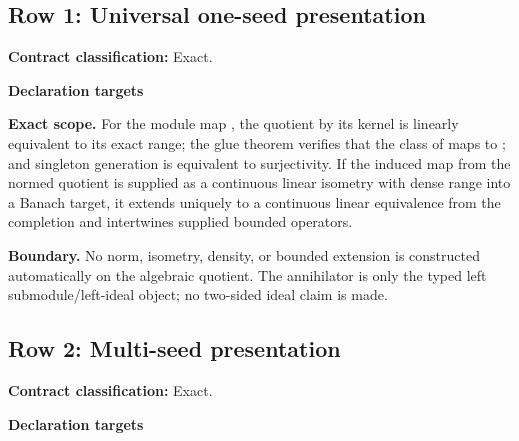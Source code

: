 \subsection{Row 1: Universal one-seed presentation}
\label{row:1}
\textbf{Contract classification:} Exact.
\par\smallskip\textbf{Declaration targets}\par
{\small\noindent{}\par}
{\small\noindent{}\par}
{\small\noindent{}\par}
{\small\noindent{}\par}
{\small\noindent{}\par}
{\small\noindent{}\par}
\medskip\noindent\textbf{Exact scope.} For the module map , the quotient by its kernel is linearly equivalent to its exact range; the glue theorem verifies that the class of  maps to ; and singleton generation is equivalent to surjectivity. If the induced map from the normed quotient is supplied as a continuous linear isometry with dense range into a Banach target, it extends uniquely to a continuous linear equivalence from the completion and intertwines supplied bounded operators.
\par\smallskip\noindent\textbf{Boundary.} No norm, isometry, density, or bounded extension is constructed automatically on the algebraic quotient. The annihilator is only the typed left submodule/left-ideal object; no two-sided ideal claim is made.
\medskip
{}\subsection{Row 2: Multi-seed presentation}
\label{row:2}
\textbf{Contract classification:} Exact.
\par\smallskip\textbf{Declaration targets}\par
{\small\noindent{}\par}
